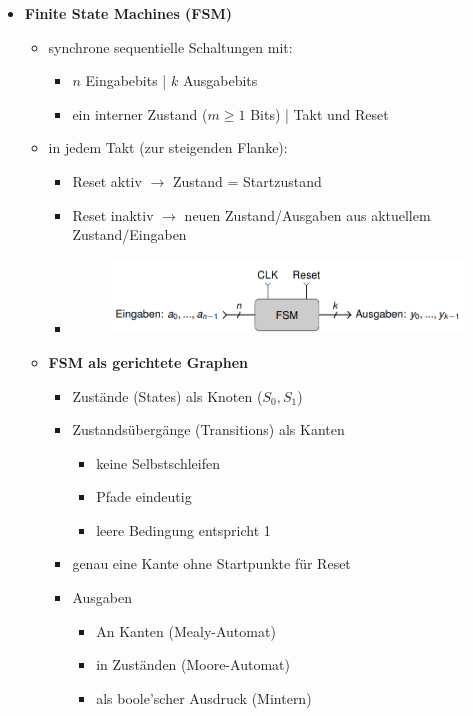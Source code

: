 \documentclass[11pt,a4paper]{article}
\begin{document}
\begin{itemize}

\item \textbf{Finite State Machines (FSM)}
	\begin{itemize}
	
	
	\item synchrone sequentielle Schaltungen mit:
		\begin{itemize}
		\item $n$ Eingabebits | $k$ Ausgabebits
		\item ein interner Zustand ($m \geq 1$ Bits) | Takt und Reset
		\end{itemize}
		
	\item in jedem Takt (zur steigenden Flanke):
		\begin{itemize}
		\item Reset aktiv $\rightarrow$ Zustand = Startzustand
		\item Reset inaktiv $\rightarrow$ neuen Zustand/Ausgaben aus aktuellem Zustand/Eingaben 
		\item[] \begin{figure}[H]
				\begin{center}
				\includegraphics[height=2cm]{Bilder/fsm1}
				\end{center}
				\end{figure}
		\end{itemize}
	
\item \textbf{FSM als gerichtete Graphen}
	\begin{itemize}
	
	\item  Zustände (States) als Knoten ($S_0,S_1$)
	\item Zustandsübergänge (Transitions) als Kanten
		\begin{itemize}
		\item keine Selbstschleifen
		\item Pfade eindeutig
		\item leere Bedingung entspricht 1
		\end{itemize}
	\item genau eine Kante ohne Startpunkte für Reset
	\item Ausgaben
		\begin{itemize}
		\item An Kanten (Mealy-Automat)
		\item in Zuständen (Moore-Automat)
		\item als boole'scher Ausdruck (Mintern)
		\end{itemize}
	

\end{itemize}
\end{itemize}
\end{itemize}
\end{document}
